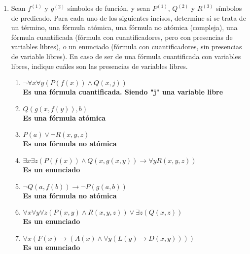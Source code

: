\documentclass[a4paper,10pt]{article}
\begin{document}
\begin{enumerate}
  \item {} Sean $f^{(1)}$ y $g^{(2)}$ s\'imbolos de funci\'on, y sean $P^{(1)}$, $Q^{(2)}$ y $R^{(3)}$ s\'imbolos de predicado.
	Para cada uno de los siguientes incisos, determine si se trata de un t\'ermino, una f\'ormula at\'omica, una f\'ormula no at\'omica (compleja), una f\'ormula cuantificada (f\'ormula con cuantificadores, pero con presencias de variables libres), o un enunciado (f\'ormula con cuantificadores, sin presencias de variable libres). 
	En caso de ser de una f\'ormula cuantificada con variables libres, indique cu\'ales son las presencias de variables libres.

  \begin{enumerate}
  	\item $\neg\forall x\forall y(P(f(x)) \land Q(x,j))$\\
    \textbf{Es una f\'ormula cuantificada. Siendo "j" una variable libre}
  	\item $Q(g(x,f(y)), b)$\\
    \textbf{Es una f\'ormula at\'omica}
  	\item $P(a) \lor \neg R(x, y, z)$\\
    \textbf{Es una f\'ormula no at\'omica}
  	\item $\exists x \exists z(P(f(x)) \wedge Q(x,g(x, y)) \to \forall y R(x,y,z))$\\
    \textbf{Es un enunciado}
  	\item $\neg Q(a, f(b)) \to \neg P(g(a, b))$\\
    \textbf{Es una f\'ormula no at\'omica}
 	  \item $\forall x \forall y \forall z(P(x,y) \wedge R(x,y,z)) \lor \exists z(Q(x,z))$\\
    \textbf{Es un enunciado}
    \item $\forall x (F(x) \to (A(x) \land \forall y (L(y) \to D(x, y))))$\\
    \textbf{Es un enunciado}


  \end{enumerate}
		
\end{enumerate}

\end{document}
